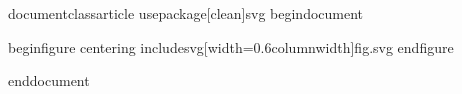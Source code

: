 %

documentclass{article}
usepackage[clean]{svg}
begin{document}


begin{figure}
centering
includesvg[width=0.6columnwidth]{fig.svg}
end{figure}











end{document}

